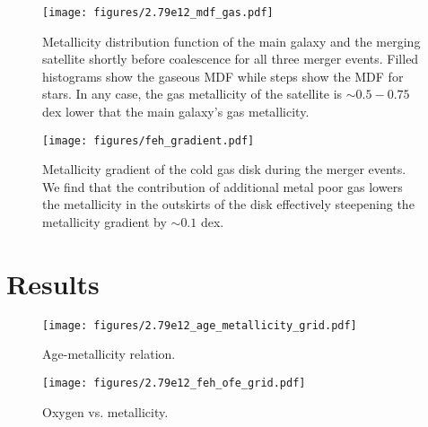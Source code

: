 \documentclass[useAMS,usenatbib]{mnras}
\begin{document}
\begin{figure*}
    \begin{centering}
        \texttt{[image: figures/2.79e12\_mdf\_gas.pdf]}
        \caption{
            Metallicity distribution function of the main galaxy and the merging satellite shortly before coalescence for all three merger events. Filled histograms show the gaseous MDF while steps show the MDF for stars. In any case, the gas metallicity of the satellite is $\sim0.5-0.75$ dex lower that the main galaxy's gas metallicity.
        }
        \label{fig:mdf}
    \end{centering}
\end{figure*}


\begin{figure*}
    \begin{centering}
        \texttt{[image: figures/feh\_gradient.pdf]}
        \caption{
            Metallicity gradient of the cold gas disk during the merger events. We find that the contribution of additional metal poor gas lowers the metallicity in the outskirts of the disk effectively steepening the metallicity gradient by $\sim 0.1$ dex.
        }
        \label{fig:feh_grad}
    \end{centering}
\end{figure*}







\section{Results} \label{sec:results}


\begin{figure*}
    \begin{centering}
        \texttt{[image: figures/2.79e12\_age\_metallicity\_grid.pdf]}
        \caption{
            Age-metallicity relation.
        }
        \label{fig:age_feh}
    \end{centering}
\end{figure*}

\begin{figure*}
    \begin{centering}
        \texttt{[image: figures/2.79e12\_feh\_ofe\_grid.pdf]}
        \caption{
            Oxygen vs. metallicity.
        }
        \label{fig:ofe_feh}
    \end{centering}
\end{figure*}
\end{document}
